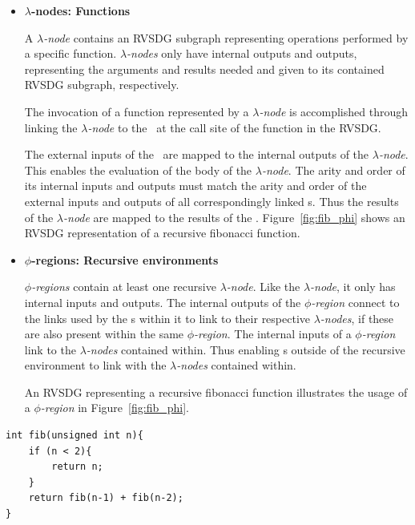 \begin{itemize}
\clearpage
\item \textbf{$\lambda$-nodes: Functions}

A \textit{$\lambda$-node} contains an RVSDG subgraph representing operations
performed by a specific function. \textit{$\lambda$-nodes} only have internal
outputs and outputs, representing the arguments and results needed and given to
its contained RVSDG subgraph, respectively.

The invocation of a function represented by a \textit{$\lambda$-node} is
accomplished through linking the \textit{$\lambda$-node} to the \applyNode~at
the call site of the function in the RVSDG.

The external inputs of the \applyNode~are mapped to the internal outputs of the
\textit{$\lambda$-node}. This enables the evaluation of the body of the
\textit{$\lambda$-node}. The arity and order of its internal inputs and outputs
must match the arity and order of the external inputs and outputs of all
correspondingly linked \applyNode s. Thus the results of the
\textit{$\lambda$-node} are mapped to the results of the \applyNode .
Figure~\ref{fig:fib_phi} shows an RVSDG representation of a recursive fibonacci
function.

\item \textbf{$\phi$-regions: Recursive environments}

\textit{$\phi$-regions} contain at least one recursive \textit{$\lambda$-node}.
Like the \textit{$\lambda$-node}, it only has internal inputs and outputs. The
internal outputs of the \textit{$\phi$-region} connect to the links used by the
\applyNode s within it to link to their respective \textit{$\lambda$-nodes}, if
these are also present within the same \textit{$\phi$-region}. The internal
inputs of a \textit{$\phi$-region} link to the \textit{$\lambda$-nodes}
contained within. Thus enabling \applyNode s outside of the recursive
environment to link with the \textit{$\lambda$-nodes} contained within.

An RVSDG representing a recursive fibonacci function illustrates the usage of
a \textit{$\phi$-region} in Figure~\ref{fig:fib_phi}.

\end{itemize}

\begin{lstlisting}[label={lst:fib_phi}, style=global_customcpp,
caption={C/C++ code corresponding to the RVSDG subgraph in
Figure~\ref{fig:fib_phi}.}]
int fib(unsigned int n){
	if (n < 2){
		return n;
	}
	return fib(n-1) + fib(n-2);
}
\end{lstlisting}
\vspace{-4\parskip} %

